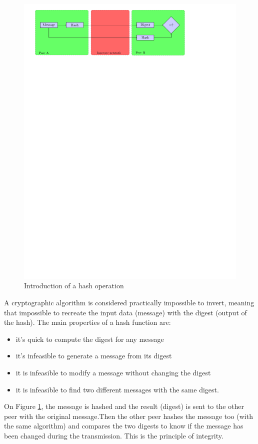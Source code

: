 \begin{figure}[!ht]
\centering
\includegraphics[trim=3.5cm 22.5cm 7.cm 0cm]{figures/hash.pdf}
\caption{Introduction of a hash operation\newline}
\label{fig:hash}
\end{figure}
A cryptographic algorithm is considered practically impossible to invert, meaning
that impossible to recreate the input data (message) with the digest (output of
the hash).
The main properties of a hash function are:
\begin{itemize}
  \item it's quick to compute the digest for any message
  \item it's infeasible to generate a message from its digest
  \item it is infeasible to modify a message without changing the digest
  \item it is infeasible to find two different messages with the same
  digest.\newline
\end{itemize}
On Figure \ref{fig:hash}, the message is hashed and the result (digest) is
sent to the other peer with the original message.\newline Then the other peer
hashes the message too (with the same algorithm) and compares the two digests to
know if the message has been changed during the transmission.\newline 
This is the principle of integrity.

